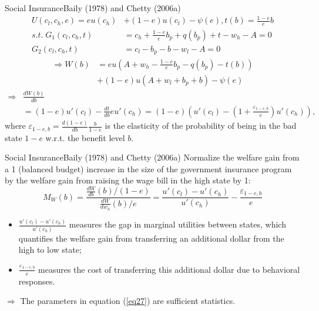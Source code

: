 \documentclass{beamer}
\begin{document}
\begin{frame}{Social Insurance}{Baily (1978) and Chetty (2006a)}
	\begin{equation}\label{eq26}
		\begin{aligned}
			U(c_l,c_h,e) = eu(c_h) &+ (1-e)u(c_l) - \psi(e), t(b) = \frac{1-e}{e}b \\
			s.t.\; G_1(c_l,c_h,t) &= c_h + \frac{1-e}{e}b_p +q(b_p) + t - w_h - A =0 \\
			G_2(c_l,c_h,t) &= c_l - b_p - b - w_l - A =0
		\end{aligned}
	\end{equation}
	\begin{equation}\nonumber
		\begin{aligned}
			\Rightarrow W(b)&=eu\left(A+w_h-\frac{1-e}{e}b_p-q(b_p)-t(b)\right)\\
			&+(1-e)u(A+w_l+b_p+b)-\psi(e)
		\end{aligned}
	\end{equation}
	\begin{equation}\nonumber
		\begin{aligned}
			\Rightarrow & \frac{dW(b)}{db} \\
			&= (1-e)u'(c_l) - \frac{dt}{db}eu'(c_h) = (1-e)\left(u'(c_l)-\left(1+\frac{\varepsilon_{1-e,b}}{e}\right)u'(c_h)\right),
		\end{aligned}
	\end{equation}
	where $\varepsilon_{1-e,b} = \frac{d(1-e)}{db}\frac{b}{1-e}$ is the elasticity of the probability of being in the bad state $1-e$ w.r.t. the benefit level $b$.
\end{frame}
\begin{frame}{Social Insurance}{Baily (1978) and Chetty (2006a)}
	Normalize the welfare gain from a 1 (balanced budget) increase in the size of the government insurance program by the welfare gain from raising the wage bill in the high state by 1:
	\begin{equation}\label{eq27}
		M_W(b) = \frac{\frac{dW}{db}(b)/(1-e)}{\frac{dW}{dw_h}(b)/e}=\frac{u'(c_l)-u'(c_h)}{u'(c_h)}-\frac{\varepsilon_{1-e,b}}{e}
	\end{equation}
	\begin{itemize}
		\item $\frac{u'(c_l)-u'(c_h)}{u'(c_h)}$ measures the gap in marginal utilities between states, which quantifies the welfare gain from transferring an additional dollar from the high to low state;
		\item $\frac{\varepsilon_{1-e,b}}{e}$ measures the cost of transferring this additional dollar due to behavioral responses.
	\end{itemize}
	\medskip

	$\Rightarrow$ The parameters in equation (\ref{eq27}) are sufficient statistics.
\end{frame}
\end{document}

